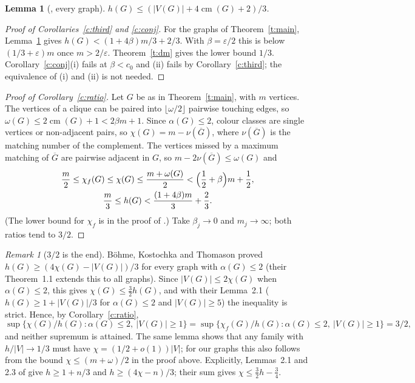 \documentclass[11pt]{article}
\newtheorem{lemma}[theorem]{Lemma}
\theoremstyle{definition}\newtheorem{conjecture}[theorem]{Conjecture}
\theoremstyle{remark}\newtheorem{remark}[theorem]{Remark}
\newcommand{\cm}{\operatorname{cm}}
\newcommand{\eps}{\varepsilon}
\begin{document}
\begin{lemma}[{\cite[prop:matching-minor]{OAIH}}, every graph]\label{l:mm}
$h(G)\le(|V(G)|+4\cm(G)+2)/3$.
\end{lemma}

\begin{proof}[Proof of Corollaries~\ref{c:third} and \ref{c:conj}]
For the graphs of Theorem~\ref{t:main}, Lemma~\ref{l:mm} gives $h(G)<(1+4\beta)m/3+2/3$. With $\beta=\eps/2$ this is below
$(1/3+\eps)m$ once $m>2/\eps$. Theorem~\ref{t:dm} gives the lower bound $1/3$. Corollary~\ref{c:conj}(i) fails at
$\beta<c_0$ and (ii) fails by Corollary~\ref{c:third}; the equivalence of (i) and (ii) \cite{KPT} is not needed.
\end{proof}

\begin{proof}[Proof of Corollary~\ref{c:ratio}]
Let $G$ be as in Theorem~\ref{t:main}, with $m$ vertices. The vertices of a clique can be paired into $\lfloor\omega/2\rfloor$
pairwise touching edges, so $\omega(G)\le2\cm(G)+1<2\beta m+1$. Since $\alpha(G)\le2$, colour classes are single vertices or
non-adjacent pairs, so $\chi(G)=m-\nu(\overline G)$, where $\nu(\overline G)$ is the matching number of the complement. The
vertices missed by a maximum matching of $\overline G$ are pairwise adjacent in $G$, so $m-2\nu(\overline G)\le\omega(G)$ and
\begin{gather*}
 \frac m2\le\chi_f(G)\le\chi(G)\le\frac{m+\omega(G)}2<\Bigl(\frac12+\beta\Bigr)m+\frac12,\\
 \frac m3\le h(G)<\frac{(1+4\beta)m}3+\frac23 .
\end{gather*}
(The lower bound for $\chi_f$ is in the proof of \cite[cor:fractional-hadwiger]{OAIH}.) Take $\beta_j\to0$ and $m_j\to\infty$; both ratios tend to $3/2$.
\end{proof}

\begin{remark}[$3/2$ is the end]\label{r:upper}
B\"ohme, Kostochka and Thomason \cite[Lemma~2.3]{BKT} proved $h(G)\ge(4\chi(G)-|V(G)|)/3$ for every graph with
$\alpha(G)\le2$ (their Theorem~1.1 extends this to all graphs). Since $|V(G)|\le2\chi(G)$ when $\alpha(G)\le2$, this gives
$\chi(G)\le\frac32h(G)$, and with their Lemma~2.1 ($h(G)\ge1+|V(G)|/3$ for $\alpha(G)\le2$ and $|V(G)|\ge5$) the
inequality is strict. Hence, by Corollary~\ref{c:ratio},
\[
 \sup\{\chi(G)/h(G):\alpha(G)\le2,\ |V(G)|\ge1\}=\sup\{\chi_f(G)/h(G):\alpha(G)\le2,\ |V(G)|\ge1\}=3/2,
\]
and neither supremum is attained. The same lemma shows that any family with $h/|V|\to1/3$ must have
$\chi=(1/2+o(1))|V|$; for our graphs this also follows from the bound $\chi\le(m+\omega)/2$ in the proof above.
Explicitly, Lemmas~2.1 and 2.3 of \cite{BKT} give $h\ge1+n/3$ and $h\ge(4\chi-n)/3$; their sum gives
$\chi\le\frac32h-\frac34$.
\end{remark}
\end{document}
